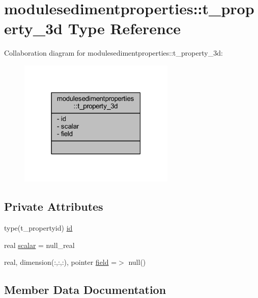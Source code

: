 \hypertarget{structmodulesedimentproperties_1_1t__property__3d}{}\section{modulesedimentproperties\+:\+:t\+\_\+property\+\_\+3d Type Reference}
\label{structmodulesedimentproperties_1_1t__property__3d}


Collaboration diagram for modulesedimentproperties\+:\+:t\+\_\+property\+\_\+3d\+:\nopagebreak
\begin{figure}[H]
\begin{center}
\leavevmode
\includegraphics[width=211pt]{structmodulesedimentproperties_1_1t__property__3d__coll__graph}
\end{center}
\end{figure}
\subsection*{Private Attributes}
\begin{DoxyCompactItemize}
\item 
type(t\+\_\+propertyid) \mbox{\hyperlink{structmodulesedimentproperties_1_1t__property__3d_aa01a15af4826867105cf27d563b9f658}{id}}
\item 
real \mbox{\hyperlink{structmodulesedimentproperties_1_1t__property__3d_a10a1a3bafbe76a5b772499e98caeea14}{scalar}} = null\+\_\+real
\item 
real, dimension(\+:,\+:,\+:), pointer \mbox{\hyperlink{structmodulesedimentproperties_1_1t__property__3d_a07909ae183633f5b8ca6ff2ed8564f28}{field}} =$>$ null()
\end{DoxyCompactItemize}


\subsection{Member Data Documentation}
\mbox{\label{structmodulesedimentproperties_1_1t__property__3d_a07909ae183633f5b8ca6ff2ed8564f28}} 
